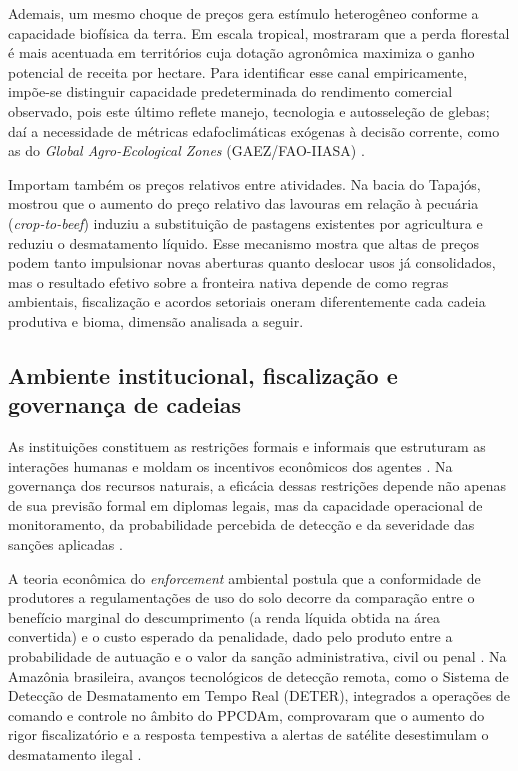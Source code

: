 Ademais, um mesmo choque de preços gera estímulo heterogêneo conforme a capacidade biofísica da terra. Em escala tropical,  mostraram que a perda florestal é mais acentuada em territórios cuja dotação agronômica maximiza o ganho potencial de receita por hectare. Para identificar esse canal empiricamente, impõe-se distinguir capacidade predeterminada do rendimento comercial observado, pois este último reflete manejo, tecnologia e autosseleção de glebas; daí a necessidade de métricas edafoclimáticas exógenas à decisão corrente, como as do \textit{Global Agro-Ecological Zones} (GAEZ/FAO-IIASA) \cite{FAOGAEZ2021}.

Importam também os preços relativos entre atividades. Na bacia do Tapajós,  mostrou que o aumento do preço relativo das lavouras em relação à pecuária (\textit{crop-to-beef}) induziu a substituição de pastagens existentes por agricultura e reduziu o desmatamento líquido. Esse mecanismo mostra que altas de preços podem tanto impulsionar novas aberturas quanto deslocar usos já consolidados, mas o resultado efetivo sobre a fronteira nativa depende de como regras ambientais, fiscalização e acordos setoriais oneram diferentemente cada cadeia produtiva e bioma, dimensão analisada a seguir.

\subsection{Ambiente institucional, fiscalização e governança de cadeias}
\label{literatura-instituicoes}

As instituições constituem as restrições formais e informais que estruturam as interações humanas e moldam os incentivos econômicos dos agentes \cite{North1991, North1993}. Na governança dos recursos naturais, a eficácia dessas restrições depende não apenas de sua previsão formal em diplomas legais, mas da capacidade operacional de monitoramento, da probabilidade percebida de detecção e da severidade das sanções aplicadas \cite{Ostrom2009, Shimshack2014}.

A teoria econômica do \textit{enforcement} ambiental postula que a conformidade de produtores a regulamentações de uso do solo decorre da comparação entre o benefício marginal do descumprimento (a renda líquida obtida na área convertida) e o custo esperado da penalidade, dado pelo produto entre a probabilidade de autuação e o valor da sanção administrativa, civil ou penal \cite{Shimshack2014}. Na Amazônia brasileira, avanços tecnológicos de detecção remota, como o Sistema de Detecção de Desmatamento em Tempo Real (DETER), integrados a operações de comando e controle no âmbito do PPCDAm, comprovaram que o aumento do rigor fiscalizatório e a resposta tempestiva a alertas de satélite desestimulam o desmatamento ilegal \cite{AssuncaoEtAl2023, AssuncaoEtAl2015}.

